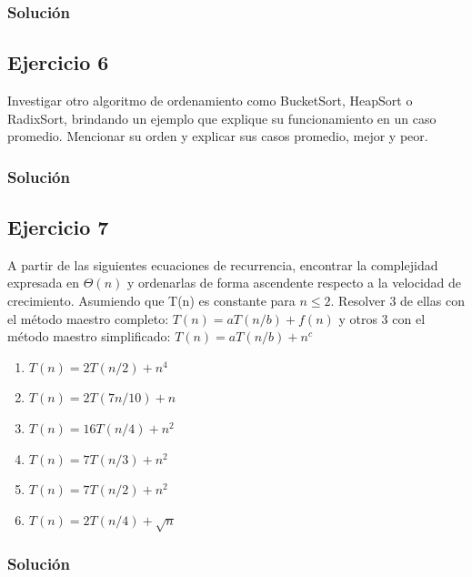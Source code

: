 \documentclass{article}
\begin{document}
\subsubsection*{Solución}


\subsection*{Ejercicio 6}
Investigar otro algoritmo de ordenamiento como BucketSort, HeapSort o RadixSort, brindando un ejemplo que explique su funcionamiento en un caso promedio. Mencionar su orden y explicar sus casos promedio, mejor y peor.
\subsubsection*{Solución}


\subsection*{Ejercicio 7}
A partir de las siguientes ecuaciones de recurrencia, encontrar la complejidad expresada en $\Theta (n)$ y ordenarlas de forma ascendente respecto a la velocidad de crecimiento. Asumiendo que T(n) es constante para $n \leq 2$. Resolver 3 de ellas con el método maestro completo: $T(n) = a T(n/b) + f(n)$ y otros 3 con el método maestro simplificado: $T(n) = a T(n/b) + n^c$
\begin{enumerate}[label=\alph*.]
    \item $T(n) = 2T(n/2) + n^4$
    \item $T(n) = 2T(7n/10) + n$
    \item $T(n) = 16T(n/4) + n^2$
    \item $T(n) = 7T(n/3) + n^2$
    \item $T(n) = 7T(n/2) + n^2$
    \item $T(n) = 2T(n/4) + \sqrt{n}$
\end{enumerate}
\subsubsection*{Solución}
\end{document}
